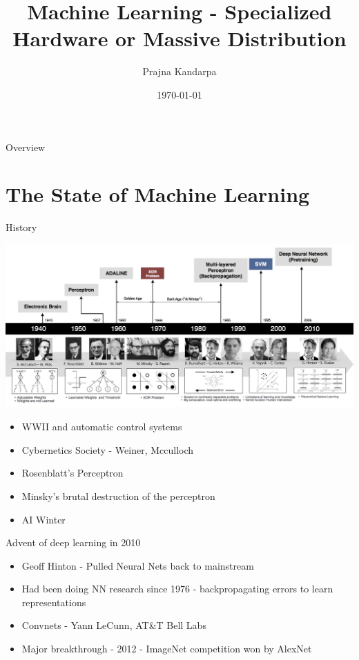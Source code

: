 \documentclass[10pt]{beamer}
\title{Machine Learning - Specialized Hardware or Massive Distribution}
\date{\today}
\author{Prajna Kandarpa}
\begin{document}
\maketitle
\begin{frame}{Overview}
  \tableofcontents
\end{frame}
\section{The State of Machine Learning}
\begin{frame}{History}
  \begin{center}
    \includegraphics[height=0.4\textwidth]{nn_timeline.jpg}
  \end{center}

  \begin{itemize}
  \item WWII and automatic control systems
  \item Cybernetics Society - Weiner, Mcculloch
  \item Rosenblatt's Perceptron\cite{DeepLear69:online}
  \item Minsky's brutal destruction of the perceptron
  \item AI Winter
  \end{itemize}
\end{frame}
\begin{frame}{Advent of deep learning in 2010}
  \begin{itemize}
  \item Geoff Hinton - Pulled Neural Nets back to mainstream
  \item Had been doing NN research since 1976 - backpropagating errors to learn representations\cite{rumelhart1988learning}
  \item Convnets - Yann LeCunn, AT\&T Bell Labs
  \item Major breakthrough - 2012 - ImageNet competition won by AlexNet
  \end{itemize}
\end{frame}
\end{document}

